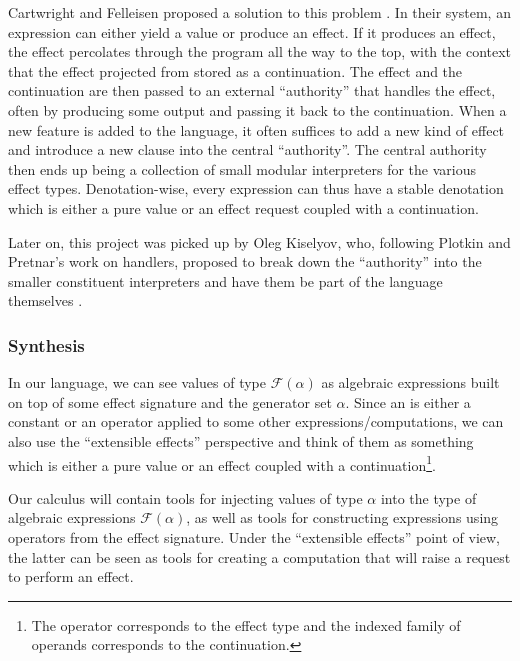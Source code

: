 Cartwright and Felleisen proposed a solution to this problem
\cite{cartwright1994extensible}. In their system, an expression can either
yield a value or produce an effect. If it produces an effect, the effect
percolates through the program all the way to the top, with the context
that the effect projected from stored as a continuation. The effect and the
continuation are then passed to an external ``authority'' that handles the
effect, often by producing some output and passing it back to the
continuation. When a new feature is added to the language, it often
suffices to add a new kind of effect and introduce a new clause into the
central ``authority''. The central authority then ends up being a
collection of small modular interpreters for the various effect
types. Denotation-wise, every expression can thus have a stable denotation
which is either a pure value or an effect request coupled with a
continuation.

Later on, this project was picked up by Oleg Kiselyov, who, following
Plotkin and Pretnar's work on handlers, proposed to break down the
``authority'' into the smaller constituent interpreters and have them be
part of the language themselves \cite{kiselyov2013extensible}.

\subsubsection*{Synthesis}

In our language, we can see values of type $\mathcal{F}(\alpha)$ as
algebraic expressions built on top of some effect signature and the
generator set $\alpha$. Since an  is either a constant or an operator applied to some other
expressions/computations, we can also use the ``extensible effects''
perspective and think of them as something which is either a pure value or
an effect coupled with a continuation\footnote{The operator corresponds to
  the effect type and the indexed family of operands corresponds to the
  continuation.}.

Our calculus will contain tools for injecting values of type $\alpha$ into
the type of algebraic expressions $\mathcal{F}(\alpha)$, as well as tools
for constructing expressions using operators from the effect
signature. Under the ``extensible effects'' point of view, the latter can
be seen as tools for creating a computation that will raise a request to
perform an effect.

